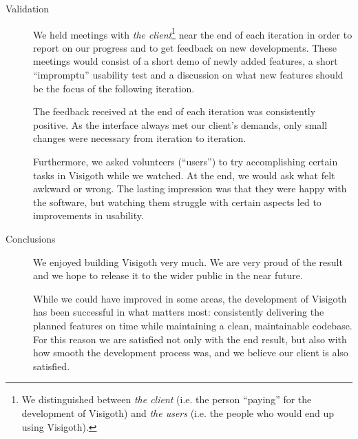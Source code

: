 \documentclass[a4paper,11pt]{article}
\begin{document}
\begin{description}
\item[Validation]

  We held meetings with \emph{the client}\footnote{We distinguished
    between \emph{the client} (i.e.  the person ``paying'' for the
    development of Visigoth) and \emph{the users} (i.e. the people who
    would end up using Visigoth).} near the end of each iteration in
  order to report on our progress and to get feedback on new
  developments. These meetings would consist of a short demo of newly
  added features, a short ``impromptu'' usability test and a
  discussion on what new features should be the focus of the following
  iteration.

  The feedback received at the end of each iteration was consistently
  positive. As the interface always met our client's demands, only
  small changes were necessary from iteration to iteration.

  Furthermore, we asked volunteers (``users'') to try accomplishing
  certain tasks in Visigoth while we watched. At the end, we would ask
  what felt awkward or wrong. The lasting impression was that they
  were happy with the software, but watching them struggle with
  certain aspects led to improvements in usability.

\item[Conclusions]

  We enjoyed building Visigoth very much. We are very proud of the
  result and we hope to release it to the wider public in the near
  future.

  While we could have improved in some areas, the development of
  Visigoth has been successful in what matters most: consistently
  delivering the planned features on time while maintaining a clean,
  maintainable codebase. For this reason we are satisfied not only
  with the end result, but also with how smooth the development
  process was, and we believe our client is also satisfied.

\end{description}
\end{document}
